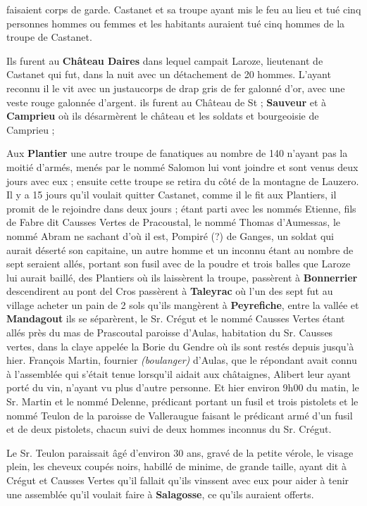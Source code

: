 

faisaient corps de garde. Castanet et sa troupe ayant mis le feu au lieu et tué cinq personnes hommes ou femmes et les habitants auraient tué cinq hommes de la troupe de Castanet.

Ils furent au \textbf{Château Daires} dans lequel campait Laroze, lieutenant de Castanet qui fut, dans la nuit avec un détachement de 20 hommes. L’ayant reconnu il le vit avec un justaucorps de drap gris de fer galonné d’or, avec une veste rouge galonnée d’argent. ils furent au Château de St ; \textbf{Sauveur} et à \textbf{Camprieu} où ils désarmèrent le château et les soldats et bourgeoisie de Camprieu ;

Aux \textbf{Plantier} une autre troupe de fanatiques au nombre de 140 n’ayant pas la moitié d’armés, menés par le nommé Salomon lui vont joindre et sont venus deux jours avec eux ; ensuite cette troupe se retira du côté de la montagne de Lauzero. Il y a 15 jours qu’il voulait quitter Castanet, comme il le fit aux Plantiers, il promit de le rejoindre dans deux jours ; étant parti avec les nommés Etienne, fils de Fabre dit Causses Vertes de Pracoustal, le nommé Thomas d’Aumessas, le nommé Abram ne sachant d’où il est, Pompiré (?) de Ganges, un soldat qui aurait déserté son capitaine, un autre homme et un inconnu étant au nombre de sept seraient allés, portant son fusil avec de la poudre et trois balles que Laroze lui aurait baillé, des Plantiers où ils laissèrent la troupe, passèrent à \textbf{Bonnerrier} descendirent au pont del Cros passèrent à \textbf{Taleyrac} où l’un des sept fut au village acheter un pain de 2 sols qu’ils mangèrent à \textbf{Peyrefiche}, entre la vallée et \textbf{Mandagout} ils se séparèrent, le Sr. Crégut et le nommé Causses Vertes étant allés près du mas de Prascoutal paroisse d’Aulas, habitation du Sr. Causses vertes, dans la claye appelée la Borie du Gendre où ils sont restés depuis jusqu’à hier. François Martin, fournier \textit{(boulanger)} d’Aulas, que le répondant avait connu à l’assemblée qui s’était tenue lorsqu’il aidait aux châtaignes, Alibert leur ayant porté du vin, n’ayant vu plus d’autre personne. Et hier environ 9h00 du matin, le Sr. Martin et le nommé Delenne, prédicant portant un fusil et trois pistolets et le nommé Teulon de la paroisse de Valleraugue faisant le prédicant armé d’un fusil et de deux pistolets, chacun suivi de deux hommes inconnus du Sr. Crégut.

Le Sr. Teulon paraissait âgé d’environ 30 ans, gravé de la petite vérole, le visage plein, les cheveux coupés noirs, habillé de minime, de grande taille, ayant dit à Crégut et Causses Vertes qu’il fallait qu’ils vinssent avec eux pour aider à tenir une assemblée qu’il voulait faire à \textbf{Salagosse}, ce qu’ils auraient offerts.


